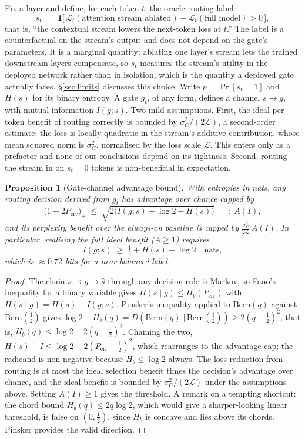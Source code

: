\documentclass[11pt,a4paper]{article}
\newtheorem{proposition}{Proposition}
\newcommand{\LL}{\mathcal{L}}
\begin{document}
Fix a layer and define, for each token $t$, the oracle routing label
\[
  s_t \;=\; \mathbf{1}\big[\,\LL_t(\text{attention stream ablated}) -
  \LL_t(\text{full model}) > 0\,\big],
\]
that is, ``the contextual stream lowers the next-token loss at $t$.'' The
label is a counterfactual on the stream's output and does not depend on
the gate's parameters. It is a marginal quantity: ablating one layer's
stream lets the trained downstream layers compensate, so $s_t$ measures
the stream's utility in the deployed network rather than in isolation,
which is the quantity a deployed gate actually faces. \S\ref{sec:limits}
discusses this choice. Write $p = \Pr[s_t{=}1]$ and $H(s)$ for its binary
entropy. A gate $g_t$, of any form, defines a channel $s \to g$, with
mutual information $I(g;s)$. Two mild assumptions. First, the ideal per-token benefit of routing
correctly is bounded by $\sigma_C^2/(2\LL)$, a second-order estimate: the
loss is locally quadratic in the stream's additive contribution, whose
mean squared norm is $\sigma_C^2$, normalised by the loss scale $\LL$.
This enters only as a prefactor and none of our conclusions depend on its
tightness. Second, routing the stream in on $s_t{=}0$ tokens is
non-beneficial in expectation.

\begin{proposition}[Gate-channel advantage bound]
\label{prop:channel}
With entropies in nats, any routing decision derived from $g_t$ has
advantage over chance capped by
\[
  \bigl(1 - 2P_{\mathrm{err}}\bigr)_+ \;\le\;
  \sqrt{2\bigl(I(g;s) + \log 2 - H(s)\bigr)} \;=:\; A(I),
\]
and its perplexity benefit over the always-on baseline is capped by
$\frac{\sigma_C^2}{2\LL}\, A(I)$. In particular, realising the full ideal
benefit ($A \geq 1$) requires
\[
  I(g;s) \;\geq\; \tfrac12 + H(s) - \log 2 \quad\text{nats},
\]
which is $\approx 0.72$ bits for a near-balanced label.
\end{proposition}

\begin{proof}
The chain $s \to g \to \hat{s}$ through any decision rule is Markov, so
Fano's inequality for a binary variable gives
$H(s \mid g) \le H_b(P_{\mathrm{err}})$ with
$H(s \mid g) = H(s) - I(g;s)$. Pinsker's inequality applied to
$\mathrm{Bern}(q)$ against $\mathrm{Bern}(\tfrac12)$ gives
$\log 2 - H_b(q) = D(\mathrm{Bern}(q)\,\Vert\,\mathrm{Bern}(\tfrac12))
\ge 2(q - \tfrac12)^2$, that is,
$H_b(q) \le \log 2 - 2(q-\tfrac12)^2$. Chaining the two,
$H(s) - I \le \log 2 - 2(P_{\mathrm{err}} - \tfrac12)^2$, which
rearranges to the advantage cap; the radicand is non-negative because
$H_b \le \log 2$ always. The loss reduction from routing is at most the
ideal selection benefit times the decision's advantage over chance, and
the ideal benefit is bounded by $\sigma_C^2/(2\LL)$ under the assumptions
above. Setting $A(I) \ge 1$ gives the threshold. A remark on a tempting
shortcut: the chord bound $H_b(q) \le 2q \log 2$, which would give a
sharper-looking linear threshold, is false on $(0, \tfrac12)$, since
$H_b$ is concave and lies above its chords. Pinsker provides the valid
direction.
\end{proof}
\end{document}

